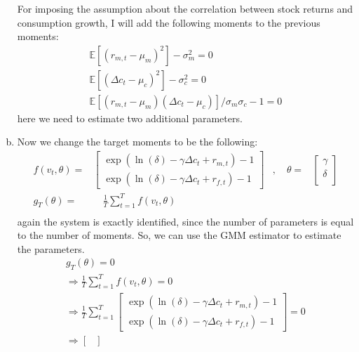 \begin{enumerate}[(a)]
      For imposing the assumption about the correlation between stock returns and consumption growth, I will add the following moments to the previous moments:
      \begin{gather*}
        \mathbb{E}[(r_{m,t} - \mu_m)^2] - \sigma_m^2 = 0\\
        \mathbb{E}[(\Delta c_t - \mu_c)^2] - \sigma_c^2 = 0\\
        \mathbb{E}[(r_{m,t} - \mu_m)(\Delta c_t - \mu_c)] / \sigma_m \sigma_c  - 1 = 0
      \end{gather*}
      here we need to estimate two additional parameters.

      \item Now we change the target moments to be the following:
      \begin{equation*}
        \begin{aligned}
          f(v_t,\theta) = & \begin{bmatrix}
            \exp(\ln(\delta) - \gamma\Delta c_t + r_{m,t})-1 \\
            \exp(\ln(\delta) - \gamma\Delta c_t + r_{f,t})-1
          \end{bmatrix} & , \quad 
          \theta = & \begin{bmatrix}
            \gamma \\
            \delta \\
          \end{bmatrix}  \\
          g_T(\theta) = & \quad \frac{1}{T} \sum_{t=1}^T f(v_t,\theta) & \\
        \end{aligned}
        \end{equation*}
        again the system is exactly identified, since the number of parameters is equal to the number of moments. So, we can use the GMM estimator to estimate the parameters.
        \begin{gather*}
          g_T(\theta) = 0\\
          \Rightarrow\frac{1}{T} \sum_{t=1}^T f(v_t,\theta) = 0\\
          \Rightarrow\frac{1}{T} \sum_{t=1}^T \begin{bmatrix}
            \exp(\ln(\delta) - \gamma\Delta c_t + r_{m,t})-1 \\
            \exp(\ln(\delta) - \gamma\Delta c_t + r_{f,t})-1
          \end{bmatrix} = 0\\
          \Rightarrow \begin{bmatrix}

\end{bmatrix}
\end{gather*}
\end{enumerate}
